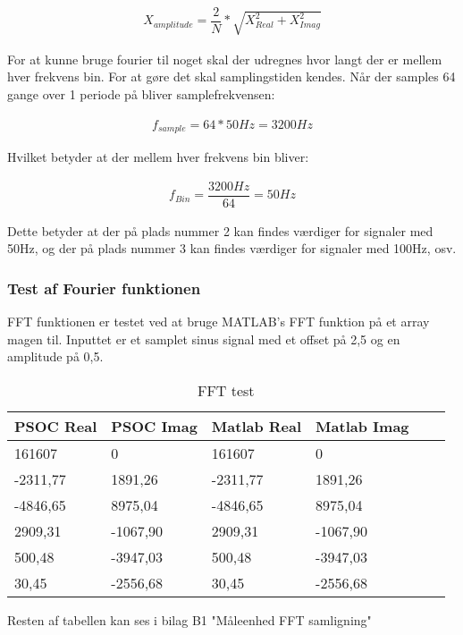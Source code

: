 \begin{align}
X_{amplitude} = \dfrac{2}{N}*\sqrt{X_{Real}^{2}+X_{Imag}^{2}}
\end{align} 	  


For at kunne bruge fourier til noget skal der udregnes hvor langt der er mellem hver frekvens bin. For at gøre det skal samplingstiden kendes. Når der samples 64 gange over 1 periode på bliver samplefrekvensen:

\begin{align}
f_{sample} = 64 * 50Hz = 3200Hz
\end{align}   

Hvilket betyder at der mellem hver frekvens bin bliver:

\begin{align}
f_{Bin} = \dfrac{3200Hz}{64} = 50Hz
\end{align}

Dette betyder at der på plads nummer 2 kan findes værdiger for signaler med 50Hz, og der på plads nummer 3 kan findes værdiger for signaler med 100Hz, osv.

\subsubsection{Test af Fourier funktionen}
FFT funktionen er testet ved at bruge MATLAB's FFT funktion på et array magen til. Inputtet er et samplet sinus signal med et offset på 2,5 og en amplitude på 0,5.

\begin{table}[H] 
	\centering 
	\begin{tabular}{|l|l|l|l|l|l|} %
		\hline 	%
		PSOC Real				& PSOC Imag 	&Matlab Real    	&Matlab Imag 	 \\ \hline 	
		161607		&0				&161607		&0 	 \\ \hline 
		-2311,77	&1891,26		&-2311,77	&1891,26	 \\ \hline
		-4846,65	&8975,04		&-4846,65	&8975,04	 \\ \hline
		2909,31 	&-1067,90		&2909,31 	&-1067,90	 \\ \hline 
		500,48 		&-3947,03		&500,48 	&-3947,03	 \\ \hline 
		30,45		&-2556,68		&30,45		&-2556,68 \\ \hline   
	\end{tabular} 
	\caption{FFT test} 
	\label{tab:fftTest} 
\end{table}
Resten af tabellen kan ses i bilag B1 "Måleenhed FFT samligning" 

